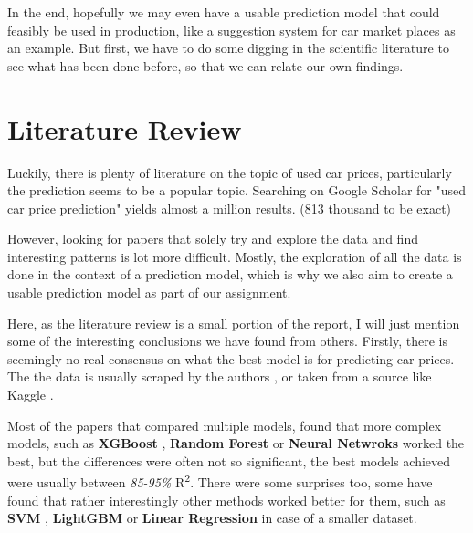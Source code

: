 \documentclass[12pt]{article}
\begin{document}
In the end, hopefully we may even have a usable prediction model that could feasibly be used in production, like a suggestion system for car market places as an example.
But first, we have to do some digging in the scientific literature to see what has been done before, so that we can relate our own findings.

\newpage
\section{Literature Review}

Luckily, there is plenty of literature on the topic of used car prices, particularly the prediction seems to be a popular topic. Searching on Google Scholar for "used car price prediction" yields almost a million results. (813 thousand to be exact)

However, looking for papers that solely try and explore the data and find interesting patterns is lot more difficult. Mostly, the exploration of all the data is done in the context of a prediction model, which is why we also aim to create a usable prediction model as part of our assignment.

Here, as the literature review is a small portion of the report, I will just mention some of the interesting conclusions we have found from others. Firstly, there is seemingly no real consensus on what the best model is for predicting car prices. The the data is usually scraped by the authors \cite{gegicCarPricePrediction2019}\cite{bukvicPricePredictionClassification2022}\cite{jinPricePredictionUsed2021}, or taken from a source like Kaggle \cite{zhengMachineLearningOptimization2025}\cite{nandanPreownedCarPrice2023}.

Most of the papers that compared multiple models, found that more complex models, such as \textbf{XGBoost} \cite{nandanPreownedCarPrice2023}, \textbf{Random Forest} \cite{vossResalePricePrediction}\cite{jinPricePredictionUsed2021} or \textbf{Neural Netwroks}\cite{liuResearchPredictionModel2022} worked the best, but the differences were often not so significant, the best models achieved were usually between \textit{85-95\%} R\textsuperscript{2}.
There were some surprises too, some have found that rather interestingly other methods worked better for them, such as \textbf{SVM} \cite{shaprapawadCarPricePrediction2023a}, \textbf{LightGBM} \cite{liResearchUsedCar2022} or \textbf{Linear Regression} \cite{bukvicPricePredictionClassification2022} in case of a smaller dataset.
\end{document}
